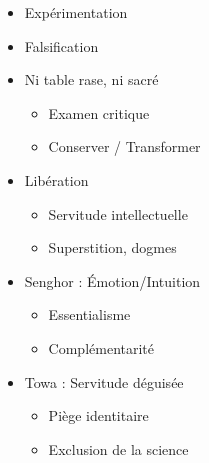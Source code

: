 \documentclass[11pt]{article}
\begin{document}
\begin{popfigure}
\begin{tcbraster}[raster columns=2,raster equal height=rows,raster column skip=6pt,raster row skip=6pt,enhanced,blankest]
\begin{tcolorbox}
\begin{itemize}[nosep,leftmargin=*,itemsep=1pt,font=\scriptsize]
\begin{itemize}[nosep,leftmargin=1.1em,itemsep=0pt]
\item Expérimentation
\item Falsification
\end{itemize}
\end{itemize}
\end{tcolorbox}
\begin{tcolorbox}[enhanced,colback=white,colframe=popgreen,boxrule=0.9pt,arc=3pt,title={Critique de la Tradition},fonttitle=\bfseries\scriptsize,coltitle=white,colbacktitle=popgreen,left=4pt,right=4pt,top=2pt,bottom=2pt,boxsep=1pt,toptitle=1.5pt,bottomtitle=1.5pt,halign=left]
\begin{itemize}[nosep,leftmargin=*,itemsep=1pt,font=\scriptsize]
\item Ni table rase, ni sacré
\begin{itemize}[nosep,leftmargin=1.1em,itemsep=0pt]
\item Examen critique
\item Conserver / Transformer
\end{itemize}
\item Libération
\begin{itemize}[nosep,leftmargin=1.1em,itemsep=0pt]
\item Servitude intellectuelle
\item Superstition, dogmes
\end{itemize}
\end{itemize}
\end{tcolorbox}
\begin{tcolorbox}[enhanced,colback=white,colframe=poppurple,boxrule=0.9pt,arc=3pt,title={Confrontation Négritude},fonttitle=\bfseries\scriptsize,coltitle=white,colbacktitle=poppurple,left=4pt,right=4pt,top=2pt,bottom=2pt,boxsep=1pt,toptitle=1.5pt,bottomtitle=1.5pt,halign=left]
\begin{itemize}[nosep,leftmargin=*,itemsep=1pt,font=\scriptsize]
\item Senghor : Émotion/Intuition
\begin{itemize}[nosep,leftmargin=1.1em,itemsep=0pt]
\item Essentialisme
\item Complémentarité
\end{itemize}
\item Towa : Servitude déguisée
\begin{itemize}[nosep,leftmargin=1.1em,itemsep=0pt]
\item Piège identitaire
\item Exclusion de la science
\end{itemize}

\end{itemize}
\end{tcolorbox}
\end{tcbraster}
\end{popfigure}
\end{document}
